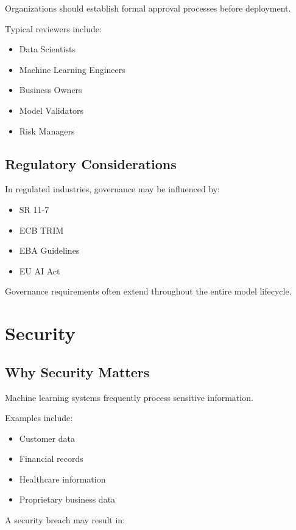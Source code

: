 Organizations should establish formal approval processes before deployment.

Typical reviewers include:

\begin{itemize}
    \item Data Scientists
    \item Machine Learning Engineers
    \item Business Owners
    \item Model Validators
    \item Risk Managers
\end{itemize}

\subsection{Regulatory Considerations}

In regulated industries, governance may be influenced by:

\begin{itemize}
    \item SR 11-7
    \item ECB TRIM
    \item EBA Guidelines
    \item EU AI Act
\end{itemize}

Governance requirements often extend throughout the entire model lifecycle.

\section{Security}

\subsection{Why Security Matters}

Machine learning systems frequently process sensitive information.

Examples include:

\begin{itemize}
    \item Customer data
    \item Financial records
    \item Healthcare information
    \item Proprietary business data
\end{itemize}

A security breach may result in:

